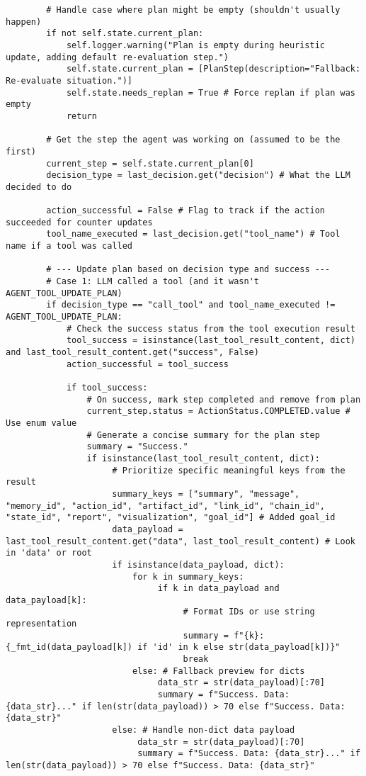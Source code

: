 \documentclass[12pt,a4paper]{article}
\begin{document}
\begin{pageablecode}
\begin{verbatim}
        # Handle case where plan might be empty (shouldn't usually happen)
        if not self.state.current_plan:
            self.logger.warning("Plan is empty during heuristic update, adding default re-evaluation step.")
            self.state.current_plan = [PlanStep(description="Fallback: Re-evaluate situation.")]
            self.state.needs_replan = True # Force replan if plan was empty
            return

        # Get the step the agent was working on (assumed to be the first)
        current_step = self.state.current_plan[0]
        decision_type = last_decision.get("decision") # What the LLM decided to do

        action_successful = False # Flag to track if the action succeeded for counter updates
        tool_name_executed = last_decision.get("tool_name") # Tool name if a tool was called

        # --- Update plan based on decision type and success ---
        # Case 1: LLM called a tool (and it wasn't AGENT_TOOL_UPDATE_PLAN)
        if decision_type == "call_tool" and tool_name_executed != AGENT_TOOL_UPDATE_PLAN:
            # Check the success status from the tool execution result
            tool_success = isinstance(last_tool_result_content, dict) and last_tool_result_content.get("success", False)
            action_successful = tool_success

            if tool_success:
                # On success, mark step completed and remove from plan
                current_step.status = ActionStatus.COMPLETED.value # Use enum value
                # Generate a concise summary for the plan step
                summary = "Success."
                if isinstance(last_tool_result_content, dict):
                     # Prioritize specific meaningful keys from the result
                     summary_keys = ["summary", "message", "memory_id", "action_id", "artifact_id", "link_id", "chain_id", "state_id", "report", "visualization", "goal_id"] # Added goal_id
                     data_payload = last_tool_result_content.get("data", last_tool_result_content) # Look in 'data' or root
                     if isinstance(data_payload, dict):
                         for k in summary_keys:
                              if k in data_payload and data_payload[k]:
                                   # Format IDs or use string representation
                                   summary = f"{k}: {_fmt_id(data_payload[k]) if 'id' in k else str(data_payload[k])}"
                                   break
                         else: # Fallback preview for dicts
                              data_str = str(data_payload)[:70]
                              summary = f"Success. Data: {data_str}..." if len(str(data_payload)) > 70 else f"Success. Data: {data_str}"
                     else: # Handle non-dict data payload
                          data_str = str(data_payload)[:70]
                          summary = f"Success. Data: {data_str}..." if len(str(data_payload)) > 70 else f"Success. Data: {data_str}"


\end{verbatim}
\end{pageablecode}
\end{document}
